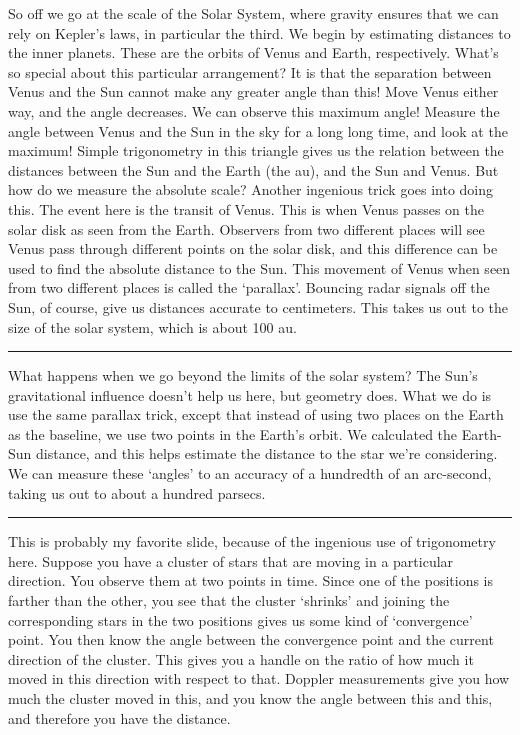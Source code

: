 \documentclass[11pt]{article}
\begin{document}
\noindent So off we go at the scale of the Solar System, where gravity ensures that we can rely on Kepler's laws, in particular the third. We begin by estimating distances to the inner planets. These are the orbits of Venus and Earth, respectively. What's so special about this particular arrangement? It is that the separation between Venus and the Sun cannot make any greater angle than this! Move Venus either way, and the angle decreases. We can observe this maximum angle! Measure the angle between Venus and the Sun in the sky for a long long time, and look at the maximum! Simple trigonometry in this triangle gives us the relation between the distances between the Sun and the Earth (the au), and the Sun and Venus. But how do we measure the absolute scale? Another ingenious trick goes into doing this. The event here is the transit of Venus. This is when Venus passes on the solar disk as seen from the Earth. Observers from two different places will see Venus pass through different points on the solar disk, and this difference can be used to find the absolute distance to the Sun. This movement of Venus when seen from two different places is called the `parallax'. Bouncing radar signals off the Sun, of course, give us distances accurate to centimeters. This takes us out to the size of the solar system, which is about 100 au.

\noindent\rule[0.5ex]{\linewidth}{1pt}

\noindent What happens when we go beyond the limits of the solar system? The Sun's gravitational influence doesn't help us here, but geometry does. What we do is use the same parallax trick, except that instead of using two places on the Earth as the baseline, we use two points in the Earth's orbit. We calculated the Earth-Sun distance, and this helps estimate the distance to the star we're considering. We can measure these `angles' to an accuracy of a hundredth of an arc-second, taking us out to about a hundred parsecs.

\noindent\rule[0.5ex]{\linewidth}{1pt}

\noindent This is probably my favorite slide, because of the ingenious use of trigonometry here. Suppose you have a cluster of stars that are moving in a particular direction. You observe them at two points in time. Since one of the positions is farther than the other, you see that the cluster `shrinks' and joining the corresponding stars in the two positions gives us some kind of `convergence' point. You then know the angle between the convergence point and the current direction of the cluster. This gives you a handle on the ratio of how much it moved in this direction with respect to that. Doppler measurements give you how much the cluster moved in this, and you know the angle between this and this, and therefore you have the distance.
\end{document}
